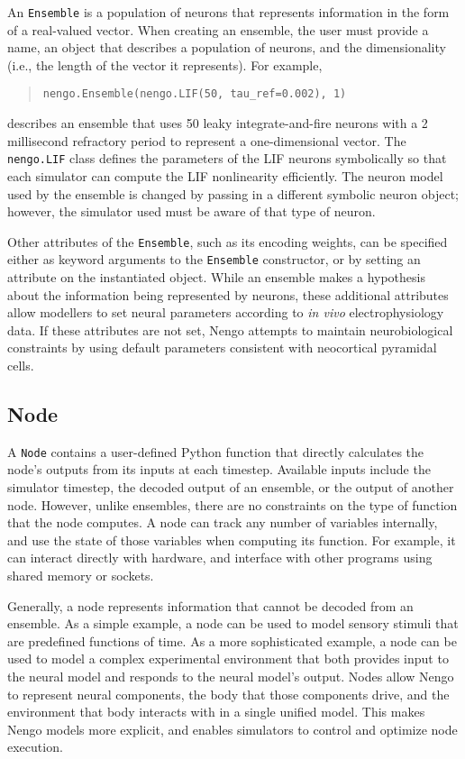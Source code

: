 \documentclass{frontiersSCNS}
\begin{document}
An \texttt{Ensemble} is
a population of neurons
that represents information
in the form of a real-valued vector.
When creating an ensemble,
the user must provide a name,
an object that describes
a population of neurons,
and the dimensionality
(i.e., the length of the vector it represents).
For example,
\begin{quote}
  \texttt{nengo.Ensemble(nengo.LIF(50, tau\_ref=0.002), 1)}
\end{quote}
describes an ensemble
that uses 50 leaky integrate-and-fire neurons \citep{lapicque1907}
with a 2 millisecond refractory period
to represent a one-dimensional vector.
The \texttt{nengo.LIF} class defines
the parameters of the LIF neurons symbolically
so that each simulator can compute
the LIF nonlinearity efficiently.
The neuron model used by the ensemble
is changed by passing in a different symbolic neuron object;
however, the simulator used must be aware
of that type of neuron.

Other attributes of the \texttt{Ensemble},
such as its encoding weights,
can be specified
either as keyword arguments
to the \texttt{Ensemble} constructor,
or by setting an attribute on the instantiated object.
While an ensemble makes a hypothesis
about the information being represented by neurons,
these additional attributes
allow modellers to set
neural parameters according to \textit{in vivo}
electrophysiology data.
If these attributes are not set,
Nengo attempts to maintain
neurobiological constraints
by using default parameters
consistent with
neocortical pyramidal cells.

\subsection{Node}

A \texttt{Node} contains a user-defined
Python function that directly calculates
the node's outputs from its inputs at each timestep.
Available inputs include
the simulator timestep,
the decoded output of an ensemble,
or the output of another node.
However, unlike ensembles,
there are no constraints on the type
of function that the node computes.
A node can track any number of variables internally,
and use the state of those variables
when computing its function.
For example, it can interact directly with hardware,
and interface with other programs
using shared memory or sockets.

Generally, a node represents information
that cannot be decoded from an ensemble.
As a simple example,
a node can be used to model sensory stimuli
that are predefined functions of time.
As a more sophisticated example,
a node can be used to model
a complex experimental environment that
both provides input to the neural model
and responds to the neural model's output.
Nodes allow Nengo to represent
neural components,
the body that those components drive,
and the environment that body interacts with
in a single unified model.
This makes Nengo models more explicit,
and enables simulators
to control and optimize node execution.
\end{document}
